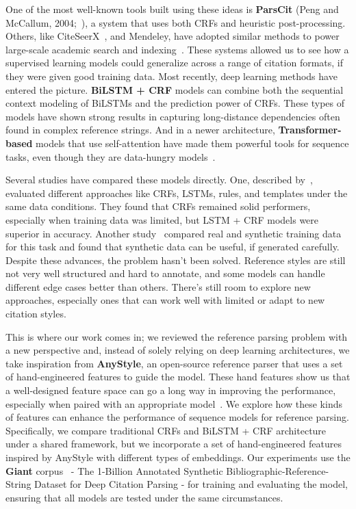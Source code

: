 One of the most well-known tools built using these ideas is \textbf{ParsCit} (Peng and McCallum, 2004;~\cite{councill-etal-2008-parscit}), a system that uses both CRFs and heuristic post-processing. Others, like CiteSeerX~\cite{citeseerx}, and Mendeley, have adopted similar methods to power large-scale academic search and indexing~\cite{prasad2018neuralparscit}. These systems allowed us to see how a supervised learning models could generalize across a range of citation formats, if they were given good training data.
Most recently, deep learning methods have entered the picture. \textbf{BiLSTM + CRF} models can combine both the sequential context modeling of BiLSTMs and the prediction power of CRFs. These types of models have shown strong results in capturing long-distance dependencies often found in complex reference strings. And in a newer architecture, \textbf{Transformer-based} models that use self-attention have made them powerful tools for sequence tasks, even though they are data-hungry models~\cite{opensourcebib,Syntheticvreal,jain2023entityextraction,annotatedcorpus}.

Several studies have compared these models directly. One, described by~\cite{opensourcebib}, evaluated different approaches like CRFs, LSTMs, rules, and templates under the same data conditions. They found that CRFs remained solid performers, especially when training data was limited, but LSTM + CRF models were superior in accuracy. Another study~\cite{Syntheticvreal} compared real and synthetic training data for this task and found that synthetic data can be useful, if generated carefully.
Despite these advances, the problem hasn’t been solved. Reference styles are still not very well structured and hard to annotate, and some models can handle different edge cases better than others. There’s still room to explore new approaches, especially ones that can work well with limited or adapt to new citation styles.

This is where our work comes in; we reviewed the reference parsing problem with a new perspective and, instead of solely relying on deep learning architectures, we take inspiration from \textbf{AnyStyle}, an open-source reference parser that uses a set of hand-engineered features to guide the model. These hand features show us that a well-designed feature space can go a long way in improving the performance, especially when paired with an appropriate model~\cite{anystyle}.
We explore how these kinds of features can enhance the performance of sequence models for reference parsing. Specifically, we compare traditional CRFs and BiLSTM + CRF architecture under a shared framework, but we incorporate a set of hand-engineered features inspired by AnyStyle with different types of embeddings. Our experiments use the \textbf{Giant} corpus~\cite{giant} - The 1-Billion Annotated Synthetic Bibliographic-Reference-String Dataset for Deep Citation Parsing - for training and evaluating the model, ensuring that all models are tested under the same circumstances.

